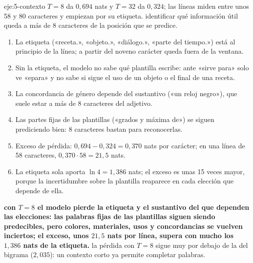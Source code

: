 \begin{solucion}{eje:5-contexto}
\datos $T=8$ da $0{,}694$ nats y $T=32$ da $0{,}324$; las líneas miden entre unos 58 y 80 caracteres y empiezan por su etiqueta.
\planteamiento identificar qué información útil queda a más de 8 caracteres de la posición que se predice.
\pasos
\begin{enumerate}[label=\arabic*.]
  \item La etiqueta («receta.», «objeto.», «diálogo.», «parte del tiempo.») está al principio de la línea; a partir del noveno carácter queda fuera de la ventana.
  \item Sin la etiqueta, el modelo no sabe qué plantilla escribe: ante «sirve para» solo ve «e\vs para\vs» y no sabe si sigue el uso de un objeto o el final de una receta.
  \item La concordancia de género depende del sustantivo («un reloj negro»), que suele estar a más de 8 caracteres del adjetivo.
  \item Las partes fijas de las plantillas («grados y máxima de») se siguen prediciendo bien: 8 caracteres bastan para reconocerlas.
  \item Exceso de pérdida: $0{,}694-0{,}324=0{,}370$ nats por carácter; en una línea de 58 caracteres, $0{,}370\cdot 58=21{,}5$ nats.
  \item La etiqueta sola aporta $\ln 4=1{,}386$ nats; el exceso es unas 15 veces mayor, porque la incertidumbre sobre la plantilla reaparece en cada elección que depende de ella.
\end{enumerate}
\resultado \textbf{con $T=8$ el modelo pierde la etiqueta y el sustantivo del que dependen las elecciones: las palabras fijas de las plantillas siguen siendo predecibles, pero colores, materiales, usos y concordancias se vuelven inciertos; el exceso, unos $21{,}5$ nats por línea, supera con mucho los $1{,}386$ nats de la etiqueta.}
\comprobacion la pérdida con $T=8$ sigue muy por debajo de la del bigrama ($2{,}035$): un contexto corto ya permite completar palabras.
\end{solucion}
